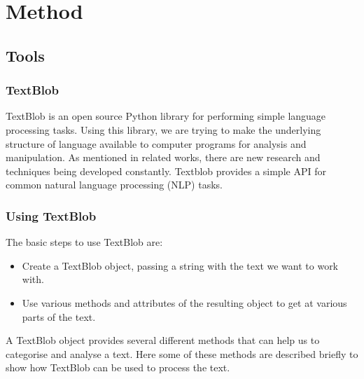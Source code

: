\documentclass[a4paper]{article}
\begin{document}
 



\section{Method}  
\subsection{Tools}  
\subsubsection{TextBlob}
TextBlob is an open source Python library for performing simple  language processing tasks. Using this library, we are trying to make  the underlying structure of language available to computer programs for analysis and manipulation. {\color{red} As mentioned in related works, there are new research and techniques being developed constantly.} Textblob provides a simple API for common natural language processing (NLP) tasks. 



\subsubsection{Using TextBlob}

The basic steps to use TextBlob are:

\begin{itemize}  
\item Create a TextBlob object, passing a string with the text we want to work with.
\item Use various methods and attributes of the resulting object to get at various parts of the text.
\end{itemize}

A TextBlob object provides several different methods that can help us to categorise and analyse a text. Here some of these methods are described briefly to show how TextBlob can be used to process the text. 
\end{document}
